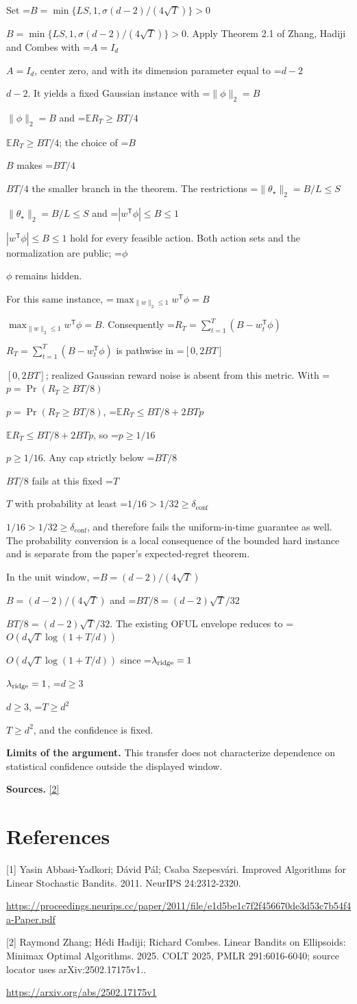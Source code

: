 \documentclass[10pt,a4paper]{article}
\newcommand{\AtlasMath}[1]{\par\begingroup\centering\setbox0=\hbox{$\displaystyle #1$}\ifdim\wd0>1.4\linewidth\typeout{ATLAS WIDE FORMULA: \the\wd0}\fi\ifdim\wd0>\linewidth\resizebox{\linewidth}{!}{\box0}\else\box0\fi\par\endgroup}
\newcommand{\AtlasInlineMath}[1]{\begingroup\setbox0=\hbox{$#1$}\ifdim\wd0>.4\linewidth\endgroup\AtlasMath{#1}\else\endgroup$#1$\fi}
\begin{document}
Set \AtlasInlineMath{B=\min\{LS,1,\sigma(d-2)/(4\sqrt T)\}>0}. Apply Theorem 2.1 of Zhang, Hadiji and Combes with \AtlasInlineMath{A=I_d}, center zero, and with its dimension parameter equal to \AtlasInlineMath{d-2}. It yields a fixed Gaussian instance with \AtlasInlineMath{\|\phi\|_2=B} and \AtlasInlineMath{\mathbb E R_T\ge BT/4}; the choice of \AtlasInlineMath{B} makes \AtlasInlineMath{BT/4} the smaller branch in the theorem. The restrictions \AtlasInlineMath{\|\theta_\star\|_2=B/L\le S} and \AtlasInlineMath{|w^{\mathsf T}\phi|\le B\le1} hold for every feasible action. Both action sets and the normalization are public; \AtlasInlineMath{\phi} remains hidden.

For this same instance, \AtlasInlineMath{\max_{\|w\|_2\le1}w^{\mathsf T}\phi=B}. Consequently \AtlasInlineMath{R_T=\sum_{t=1}^T(B-w_t^{\mathsf T}\phi)} is pathwise in \AtlasInlineMath{[0,2BT]}; realized Gaussian reward noise is absent from this metric. With \AtlasInlineMath{p=\Pr(R_T\ge BT/8)}, \AtlasInlineMath{\mathbb E R_T\le BT/8+2BTp}, so \AtlasInlineMath{p\ge1/16}. Any cap strictly below \AtlasInlineMath{BT/8} fails at this fixed \AtlasInlineMath{T} with probability at least \AtlasInlineMath{1/16>1/32\ge\delta_{\mathrm{conf}}}, and therefore fails the uniform-in-time guarantee as well. The probability conversion is a local consequence of the bounded hard instance and is separate from the paper's expected-regret theorem.

In the unit window, \AtlasInlineMath{B=(d-2)/(4\sqrt T)} and \AtlasInlineMath{BT/8=(d-2)\sqrt T/32}. The existing OFUL envelope reduces to \AtlasInlineMath{O(d\sqrt T\log(1+T/d))} since \AtlasInlineMath{\lambda_{\rm ridge}=1}, \AtlasInlineMath{d\ge3}, \AtlasInlineMath{T\ge d^2}, and the confidence is fixed.

\textbf{Limits of the argument.} This transfer does not characterize dependence on statistical confidence outside the displayed window.

\textbf{Sources.} \href{https://arxiv.org/abs/2502.17175v1}{[2]}

\section{References}
[1] Yasin Abbasi-Yadkori; Dávid Pál; Csaba Szepesvári. Improved Algorithms for Linear Stochastic Bandits. 2011. NeurIPS 24:2312-2320.

\url{https://proceedings.neurips.cc/paper/2011/file/e1d5be1c7f2f456670de3d53c7b54f4a-Paper.pdf}

[2] Raymond Zhang; Hédi Hadiji; Richard Combes. Linear Bandits on Ellipsoids: Minimax Optimal Algorithms. 2025. COLT 2025, PMLR 291:6016-6040; source locator uses arXiv:2502.17175v1..

\url{https://arxiv.org/abs/2502.17175v1}
\end{document}
